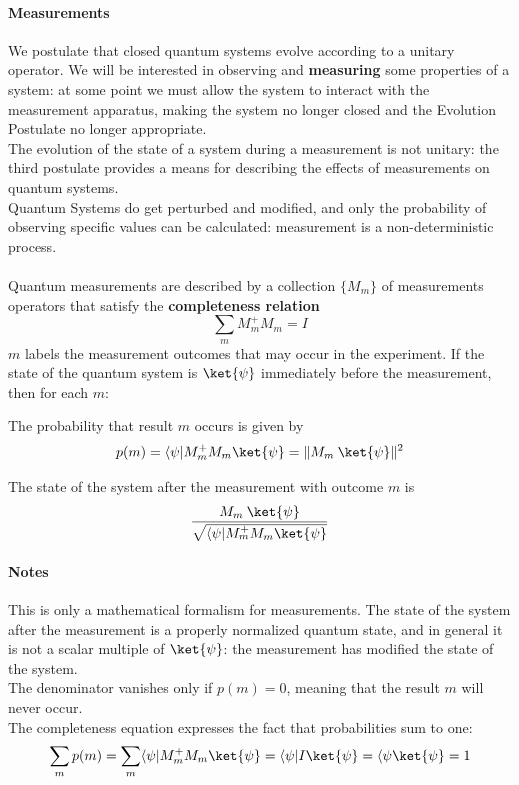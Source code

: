 \documentclass[10pt]{report}
\begin{document}
\paragraph{Measurements} We postulate that closed quantum systems evolve according to a unitary operator. We will be interested in observing and \textbf{measuring} some properties of a system: at some point we must allow the system to interact with the measurement apparatus, making the system no longer closed and the Evolution Postulate no longer appropriate.\\
The evolution of the state of a system during a measurement is not unitary: the third postulate provides a means for describing the effects of measurements on quantum systems.\\
Quantum Systems do get perturbed and modified, and only the probability of observing specific values can be calculated: measurement is a non-deterministic process.\\\\
Quantum measurements are described by a collection $\{M_m\}$ of measurements operators that satisfy the \textbf{completeness relation} $$\sum_m M_m^+ M_m = I$$
$m$ labels the measurement outcomes that may occur in the experiment. If the state of the quantum system is $\ket{\psi}$ immediately before the measurement, then for each $m$:
\begin{list}{}{}
	\item The probability that result $m$ occurs is given by $$p(m) = \langle\psi|M_m^+M_m\ket{\psi} = \|M_m\:\ket{\psi}\|^2$$
	\item The state of the system after the measurement with outcome $m$ is $$\frac{M_m\:\ket{\psi}}{\sqrt{\langle\psi|M_m^+M_m\ket{\psi}}}$$
\end{list}
\paragraph{Notes} This is only a mathematical formalism for measurements. The state of the system after the measurement is a properly normalized quantum state, and in general it is not a scalar multiple of $\ket{\psi}$: the measurement has modified the state of the system.\\
The denominator vanishes only if $p(m) = 0$, meaning that the result $m$ will never occur.\\
The completeness equation expresses the fact that probabilities sum to one: $$\sum_m p(m) = \sum_m \langle\psi|M_m^+M_m\ket{\psi} = \langle\psi|I\ket{\psi} = \langle\psi\ket{\psi} = 1$$
\end{document}
